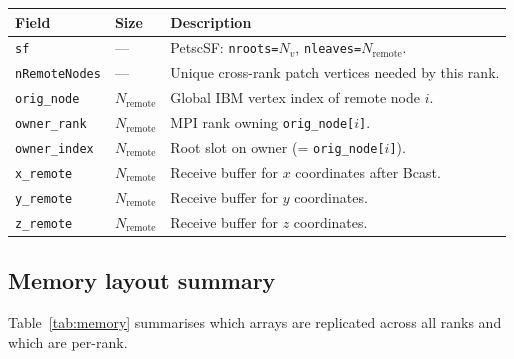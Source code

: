 \documentclass[11pt]{article}
\begin{document}
\begin{center}
\begin{tabular}{lll}
\toprule
Field & Size & Description \\
\midrule
\texttt{sf}           & ---               & PetscSF: \texttt{nroots=$N_v$}, \texttt{nleaves=$N_\text{remote}$}. \\
\texttt{nRemoteNodes} & ---               & Unique cross-rank patch vertices needed by this rank. \\
\texttt{orig\_node}   & $N_\text{remote}$ & Global IBM vertex index of remote node $i$. \\
\texttt{owner\_rank}  & $N_\text{remote}$ & MPI rank owning \texttt{orig\_node[$i$]}. \\
\texttt{owner\_index} & $N_\text{remote}$ & Root slot on owner (= \texttt{orig\_node[$i$]}). \\
\texttt{x\_remote}    & $N_\text{remote}$ & Receive buffer for $x$ coordinates after Bcast. \\
\texttt{y\_remote}    & $N_\text{remote}$ & Receive buffer for $y$ coordinates. \\
\texttt{z\_remote}    & $N_\text{remote}$ & Receive buffer for $z$ coordinates. \\
\bottomrule
\end{tabular}
\end{center}

\subsection{Memory layout summary}

Table~\ref{tab:memory} summarises which arrays are replicated across all ranks
and which are per-rank.
\end{document}

